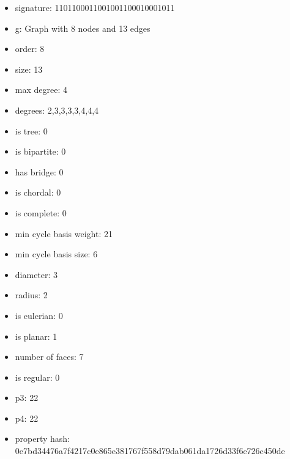 \begin{itemize}
\item signature: 1101100011001001100010001011
\item g: Graph with 8 nodes and 13 edges
\item order: 8
\item size: 13
\item max degree: 4
\item degrees: 2,3,3,3,3,4,4,4
\item is tree: 0
\item is bipartite: 0
\item has bridge: 0
\item is chordal: 0
\item is complete: 0
\item min cycle basis weight: 21
\item min cycle basis size: 6
\item diameter: 3
\item radius: 2
\item is eulerian: 0
\item is planar: 1
\item number of faces: 7
\item is regular: 0
\item p3: 22
\item p4: 22
\item property hash: 0e7bd34476a7f4217c0e865e381767f558d79dab061da1726d33f6e726c450de
\end{itemize}
\newpage
\begin{figure}
\end{figure}
